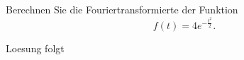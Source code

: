 \documentclass{atistandalonetask}
\begin{document}
  \begin{atiTask}[
    title = Fouriertransformation
  ]

Berechnen Sie die Fouriertransformierte der Funktion
\[
f(t)=4e^{-\frac{t^2}{2}}.
\]

  \end{atiTask}
  \begin{atiSolution}
Loesung folgt
  \end{atiSolution}
\end{document}
